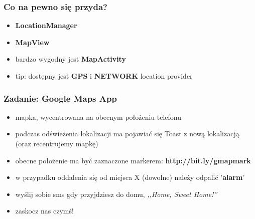\begin{frame}\frametitle{Co na pewno się przyda?}
\begin{itemize}
 \item \textbf{LocationManager}
 \item \textbf{MapView}
 \item bardzo wygodny jest \textbf{MapActivity}
 \item tip: dostępny jest \textbf{GPS} i \textbf{NETWORK} location provider
\end{itemize}
\end{frame}
 
\begin{frame}[fragile]\frametitle{Zadanie: Google Maps App}
\begin{itemize}
 \item mapka, wycentrowana na obecnym położeniu telefonu
 \item podczas odświeżenia lokalizacji ma pojawiać się Toast z nową lokalizacją (oraz recentrujemy mapkę)
 \item obecne położenie ma być zaznaczone markerem: \textbf{http://bit.ly/gmapmark}
 \item w przypadku oddalenia się od miejsca X (dowolne) należy odpalić '\textbf{alarm}'
 \item wyślij sobie sms gdy przyjdziesz do domu, \textit{,,Home, Sweet Home!''}
 \item zaskocz nas czymś!
\end{itemize}
\end{frame}
